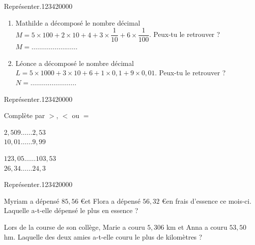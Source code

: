 \begin{pageAD}
\begin{ExoCad}{Représenter.}{1234}{2}{0}{0}{0}{0}
\begin{enumerate}
\item Mathilde a décomposé le nombre décimal  $M = 5\times 100 + 2\times 10 + 4 + 3\times \dfrac{1}{10} +  6\times \dfrac{1}{100} $. Peux-tu le retrouver ?
$M = \ldots\ldots\ldots\ldots\ldots\ldots\ldots\ldots $

\item Léonce a décomposé le nombre décimal  $L = 5\times 1000 + 3\times 10 + 6 +  1\times 0,1 +  9\times 0,01 $. Peux-tu le retrouver ?
$N = \ldots\ldots\ldots\ldots\ldots\ldots\ldots\ldots $

\end{enumerate}

\end{ExoCad}




\begin{ExoCad}{Représenter.}{1234}{2}{0}{0}{0}{0}

Complète par $>$, $<$ ou $=$ 
 
\vspace{0.4cm}
\begin{minipage}{0.5\linewidth}

$2,509 \ldots\ldots 2,53$\\
$10,01 \ldots\ldots 9,99$


\end{minipage}
\begin{minipage}{0.5\linewidth}

 $123,05 \ldots\ldots 103,53$\\
 $26,34 \ldots\ldots 24,3$
 

\end{minipage}

\end{ExoCad}

\begin{ExoCad}{Représenter.}{1234}{2}{0}{0}{0}{0}

Myriam a dépensé $85,56$ \euro et Flora a dépensé $56,32$ \euro en frais d'essence ce mois-ci. Laquelle a-t-elle dépensé le plus en essence ?



Lors de la course de son collège, Marie a couru $5,306$ km et Anna a couru $53,50$ hm. Laquelle des deux amies a-t-elle couru le plus de kilomètres ?



\end{ExoCad}


\end{pageAD} 

